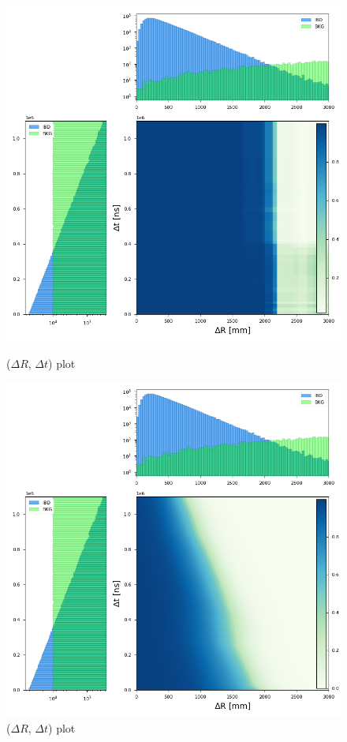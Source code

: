 \begin{figure}[h!]
	\centering
	\begin{minipage}{0.5\textwidth}
		\centering
		\includegraphics[width=0.8\linewidth]{Images/dr_dt_xgboost}
		\caption{($\Delta R$, $\Delta t$) plot}
		\label{fig:dr_dt_xgboost}
	\end{minipage}%
	\begin{minipage}{0.5\textwidth}
		\centering
		\includegraphics[width=0.8\linewidth]{Images/dr_dt_pytorch}
		\caption{($\Delta R$, $\Delta t$) plot}
		\label{fig:dr_dt_pytorch}
	\end{minipage}
\end{figure}


